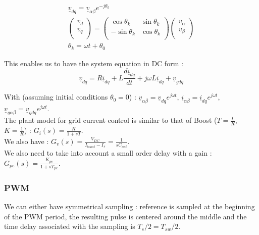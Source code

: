 \documentclass[../main.tex]{subfiles}
\begin{document}
\begin{equation}
    \begin{gathered}
        \underline{v}_{dq} = \underline{v}_{\alpha\beta} e^{-j\theta_k}\\
        \begin{pmatrix}
            v_d\\ v_q\\
        \end{pmatrix}= \begin{pmatrix}
            \cos \theta_k & \sin \theta_k\\
            -\sin \theta_k & \cos \theta_k\\
        \end{pmatrix} \begin{pmatrix}
            v_\alpha \\ v_\beta\\
        \end{pmatrix}\\
        \theta_k = \omega t + \theta_0
    \end{gathered}
\end{equation}

This enables us to have the system equation in DC form : \begin{equation}
    \underline{v}_{dq} = R \underline{i}_{dq} + L \frac{d\underline{i}_{dq}}{dt} + j\omega L \underline{i}_{dq} + \underline{v}_{gdq}
\end{equation}

With (assuming initial conditions $\theta_0 = 0$) : $\underline{v}_{\alpha \beta} = \underline{v}_{dq} e^{j\omega t}$, $\underline{i}_{\alpha \beta} = \underline{i}_{dq} e^{j\omega t}$, $\underline{v}_{g\alpha \beta} = \underline{v}_{gdq} e^{j\omega t}$.\\

The plant model for grid current control is similar to that of Boost ($T = \frac{L}{R}$, $K = \frac{1}{R}$) : $G_i(s) = \frac{K}{1+sT}$.\\

We also have : $G_v(s) = \frac{V_{DC}}{I_{boost} - I_s} = \frac{1}{sC_{out}}$.\\

We also need to take into account a small order delay with a gain : $G_{pe} (s) = \frac{K_{pe}}{1+sT_{pe}}$.

\subsubsection{PWM}
We can either have symmetrical sampling : reference is sampled at the beginning of the PWM period, the resulting pulse is centered around the middle and the time delay associated with the sampling is $T_s/2 = T_{sw}/2$.
\end{document}
